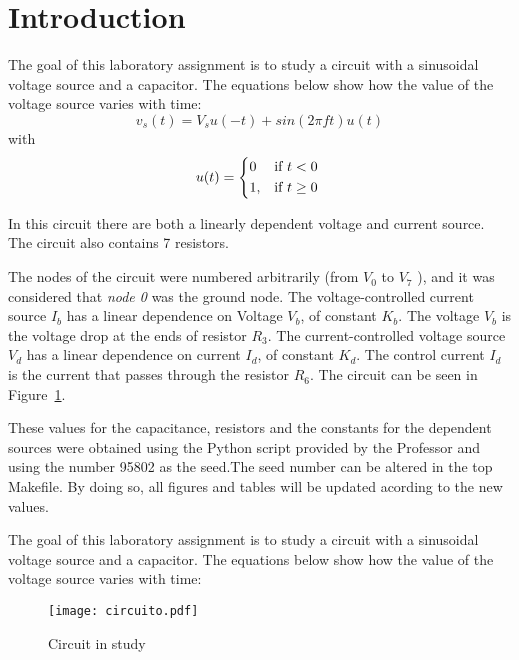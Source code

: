 \section{Introduction}
\label{sec:introduction}

\par The goal of this laboratory assignment is to study a circuit with a sinusoidal voltage source and a capacitor. The equations below show how the value of the voltage source varies with time: 
\begin {equation}
	v_s( t)  = V_s u(-t) + sin( 2 \pi f t ) u( t)
	\label{eq:i1}
\end{equation}
 with 
\begin {equation}
	u( t ) =  
	\begin{cases*} 
	  0 & if $t < 0$ \\
	1, & if $t \geq 0$
	\end{cases*}
	\label{eq:i2}
\end{equation}

In this circuit there are both a linearly dependent voltage and current source. The circuit also contains 7 resistors.\par
The nodes of the circuit were numbered arbitrarily (from {\it$V_{0}$}  to {\it$V_{7}$} ), and it was considered that {\it node 0} was the ground node. The voltage-controlled current source {\it $I_b$} has a linear dependence on Voltage {\it $V_b$}, of constant {\it $K_b$}. The voltage {\it $V_b$} is the voltage drop at the ends of resistor {\it $R_3$}. The current-controlled voltage source {\it $V_d$} has a linear dependence on current {\it $I_d$}, of constant {\it $K_d$}. The control current {\it $I_d$} is the current that passes through the resistor {\it $R_6$}.
The circuit can be seen in {Figure~\ref{fig:circuit_t2}}.\par
These values for the capacitance, resistors and the constants for the dependent sources were obtained using the Python script provided by the Professor and using the number 95802 as the seed.The seed number can be altered in the top Makefile. By doing so, all figures and tables will be updated acording to the new values. \par

The goal of this laboratory assignment is to study a circuit with a sinusoidal voltage source and a capacitor. The equations below show how the value of the voltage source varies with time:

\begin{figure}[h] \centering
\texttt{[image: circuito.pdf]}
\caption{Circuit in study}
\label{fig:circuit_t2}
\end{figure}


\pagebreak
